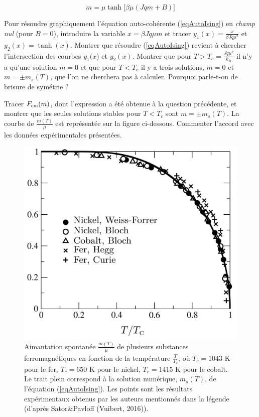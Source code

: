 \begin{equation} \label{eqAutoIsing}
m=\mu \tanh  \big[ \beta \mu(J q m +B) \big]
\end{equation}

\question
Pour résoudre graphiquement l'équation auto-cohérente (\ref{eqAutoIsing}) en {\it champ nul} (pour $B=0$), introduire la variable $x=\beta  J q \mu m$  et tracer $y_1(x)=\frac{x}{\beta  J q \mu^2}$ et $y_2(x)=\tanh (x) $. Montrer que résoudre (\ref{eqAutoIsing}) revient à chercher l'intersection des courbes $y_1(x$) et $y_2(x)$. Montrer que pour $T> T_c =\frac{Jq\mu^2}{k_B}$ il n'y a qu'une solution $m=0$ et que pour $T< T_c$ il y a trois solutions, $m=0$ et $m=\pm m_s(T)$, que l'on ne cherchera pas à calculer.  Pourquoi parle-t-on de brisure de symétrie ?

\question
Tracer $F_{\rm cm}(m)$, dont l'expression a été obtenue à la question précédente, et montrer que les seules solutions stables pour $T<T_c$ sont $m=\pm m_s(T)$.  La courbe de $\frac{m(T)}{\mu}$ est représentée sur la figure ci-dessous. Commenter l'accord avec les données expérimentales présentées.

\begin{figure}[h!]
\centering
\includegraphics[scale=0.6,angle=0]{../Fig/ising}
\caption{Aimantation spontanée $\frac{m(T)}{\mu}$ de plusieurs substances ferromagnétiques en fonction de la température $\frac{T}{T_c}$, où $T_c=1043$ K pour le fer, $T_c=650$ K pour le nickel, $T_c=1415$ K pour le cobalt. Le trait plein correspond à la solution numérique, $m_s(T)$, de l'équation (\ref{eqAutoIsing}). Les points sont les résultats expérimentaux obtenus par les auteurs mentionnés dans la légende (d'après Sator$\&$Pavloff (Vuibert, 2016)).}
\end{figure}

